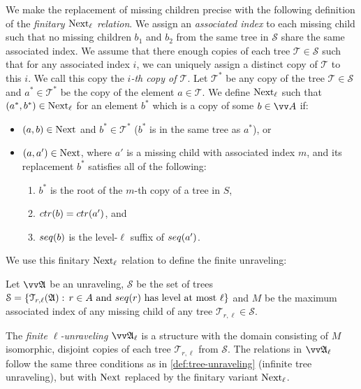 We make the replacement of missing children precise with the following definition of the \emph{finitary $\mathrm{Next}_{\ell}$ relation}.
We assign an \emph{associated index} to each missing child such that no missing children $b_{1}$ and $b_{2}$ from the same tree in $\mathcal{S}$ share the same associated index.
We assume that there enough copies of each tree $\mathcal{T} \in \mathcal{S}$ such that for any associated index $i$, we can uniquely assign a distinct copy of $\mathcal{T}$ to this $i$.
We call this copy the \emph{$i$-th copy of $\mathcal{T}$}.
Let $\mathcal{T}^{*}$ be any copy of the tree $\mathcal{T} \in \mathcal{S}$ and $a^{*} \in \mathcal{T}^{*}$ be the copy of the element $a \in \mathcal{T}$.
We define $\mathrm{Next}_{\ell}$ such that $(a^{*}, b^{*}) \in \mathrm{Next}_{\ell}$ for an element $b^{*}$ which is a copy of some $b \in \unraveldom{A}$ if:
  \begin{itemize}
    \item $(a,b) \in \mathrm{Next}$ and $b^{*} \in \mathcal{T}^{*}$ ($b^{*}$ is in the same tree as $a^{*}$), or
    \item
          $(a,a') \in \mathrm{Next}$, where $a'$ is a missing child with associated index $m$, and its replacement $b^{*}$ satisfies all of the following:
          \begin{enumerate}
            \item $b^{*}$ is the root of the $m$-th copy of a tree in $S$,
            \item $\ctr{b} = \ctr{a'}$, and
            \item $\seq{b}$ is the level-$\ell$ suffix of $\seq{a'}$.
          \end{enumerate}
  \end{itemize}
We use this finitary $\mathrm{Next}_{\ell}$ relation to define the finite unraveling:
\begin{definition}
  Let $\unravel{A}$ be an unraveling, $\mathcal{S}$ be the set of trees $\mathcal{S} = \left\{ \mathcal{T}_{r,\ell}(\str{A}):\, r \in A \text{ and } \seq{r}\ \text{has level at most $\ell$}\right\}$ and
  $M$ be the maximum associated index of any missing child of any tree $\mathcal{T}_{r,\ell} \in \mathcal{S}$.

  The \emph{finite $\ell$-unraveling} $\unravel{A}_{\ell}$ is a structure with the domain consisting of $M$ isomorphic, disjoint copies of each tree $\mathcal{T}_{r,\ell}$ from $\mathcal{S}$.
  The relations in $\unravel{A}_{\ell}$ follow the same three conditions as in \cref{def:tree-unraveling} (infinite tree unraveling), but with $\mathrm{Next}$ replaced by the finitary variant $\mathrm{Next}_{\ell}$.
\end{definition}

